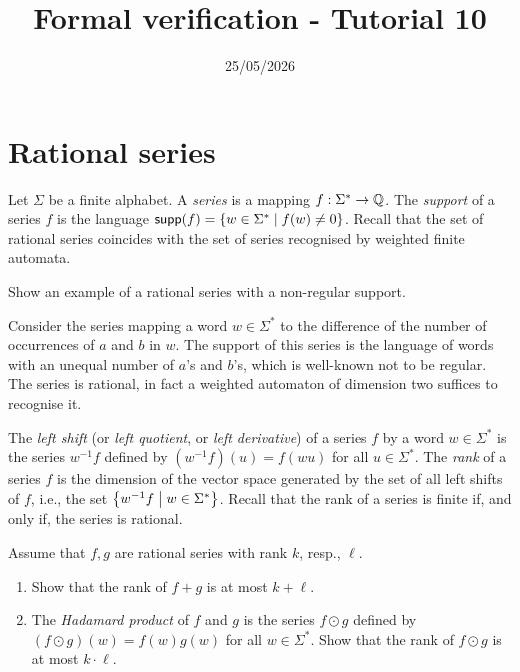 

\title{Formal verification - Tutorial 10}
\date{25/05/2026}



\maketitle

\section*{Rational series}

Let $\Sigma$ be a finite alphabet.
A \emph{series} is a mapping $f : \Sigma^* \to \mathbb Q$.
The \emph{support} of a series $f$ is the language $\mathsf{supp}(f) = \left\{ w \in \Sigma^* \;\middle|\; f(w) \neq 0\right\}$.
Recall that the set of rational series coincides with the set of series recognised by weighted finite automata.

\begin{exercise}
    Show an example of a rational series with a non-regular support.
\end{exercise}
\begin{solution}
    Consider the series mapping a word $w \in \Sigma^*$
    to the difference of the number of occurrences of $a$ and $b$ in $w$.
    The support of this series is the language of words with an unequal number of $a$'s and $b$'s,
    which is well-known not to be regular.
    The series is rational, in fact a weighted automaton of dimension two suffices to recognise it.
\end{solution}

The \emph{left shift} (or \emph{left quotient}, or \emph{left derivative}) of a series $f$ by a word $w \in \Sigma^*$
is the series $w^{-1} f$ defined by $(w^{-1} f)(u) = f(wu)$ for all $u \in \Sigma^*$.
%
The \emph{rank} of a series $f$ is the dimension of the vector space generated by
the set of all left shifts of $f$, i.e., the set $\left\{ w^{-1} f  \;\middle|\;  w \in \Sigma^*\right\}$.
%
Recall that the rank of a series is finite if, and only if, the series is rational.

\begin{exercise}
    Assume that $f, g$ are rational series with rank $k$, resp., $\ell$.
    \begin{enumerate}
        \item Show that the rank of $f + g$ is at most $k + \ell$.
        \item The \emph{Hadamard product} of $f$ and $g$
        is the series $f \odot g$ defined by $(f \odot g)(w) = f(w) g(w)$ for all $w \in \Sigma^*$.
        Show that the rank of $f \odot g$ is at most $k \cdot \ell$.
    \end{enumerate}
\end{exercise}

